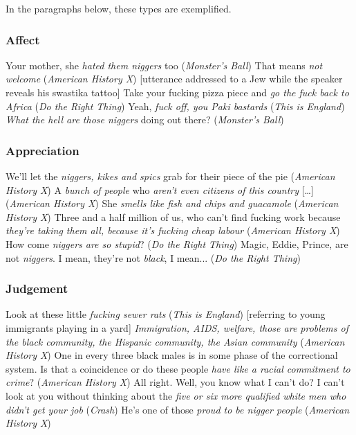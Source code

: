 \documentclass[output=paper]{LSP/langsci}
\begin{document}
In the paragraphs below, these types are exemplified.

\subsubsection{Affect}

\ea \label{ex:2:1} Your mother, she \emph{hated them niggers} too (\textit{Monster's Ball})
\z
\ea \label{ex:2:2} That means \emph{not welcome} (\textit{American History X}) [utterance addressed to a Jew while the speaker reveals his swastika tattoo]
\z
\ea \label{ex:2:3} Take your fucking pizza piece and \emph{go the fuck back to Africa} (\textit{Do the Right Thing})
\z
\ea \label{ex:2:4} Yeah, \emph{fuck off, you Paki bastards} (\textit{This is England})
\z
\ea \label{ex:2:5} \emph{What the hell are those niggers} doing out there? (\textit{Monster's Ball})
\z

\subsubsection{Appreciation}

\ea \label{ex:2:6} We'll let the \emph{niggers, kikes and spics} grab for their piece of the pie (\textit{American History X})
\z
\ea \label{ex:2:7} A \textit{bunch of people} who \emph{aren't even citizens of this country} [{\dots}] (\textit{American History X})
\z
\ea \label{ex:2:8} She \emph{smells like fish and chips and guacamole} (\textit{American History X})
\z
\ea \label{ex:2:9} Three and a half million of us, who can't find fucking work because \emph{they're taking them all, because it's fucking cheap labour} (\textit{American History X})
\z
\ea \label{ex:2:10} How come \emph{niggers are so stupid}? (\textit{Do the Right Thing})
\z
\ea \label{ex:2:11} Magic, Eddie, Prince, are not \emph{niggers}. I mean, they're not \emph{black}, I mean... (\textit{Do the Right Thing})
\z

\subsubsection{Judgement}


\ea \label{ex:2:12} Look at these little \emph{fucking sewer rats} (\textit{This is England}) [referring to young immigrants playing in a yard]
\z
\ea \label{ex:2:13} \emph{Immigration, AIDS, welfare, those are problems of the black community, the Hispanic community, the Asian community} (\textit{American History X})
\z
\ea \label{ex:2:14} One in every three black males is in some phase of the correctional system. Is that a coincidence or do these people \emph{have like a racial commitment to crime}? (\textit{American History X})
\z
\ea \label{ex:2:15} All right. Well, you know what I can't do? I can't look at you without thinking about the \emph{five or six more qualified white men who didn't get your job} (\textit{Crash})
\z
\ea \label{ex:2:16} He's one of those \emph{proud to be nigger people} (\textit{American History X})
\z
\end{document}
